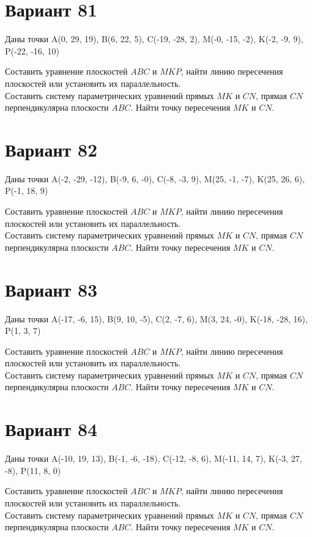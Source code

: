 \documentclass[11pt]{article}
\begin{document}
\section*{Вариант 81}
Даны точки A(0, 29, 19), B(6, 22, 5), C(-19, -28, 2), M(-0, -15, -2), K(-2, -9, 9), P(-22, -16, 10)

Составить уравнение плоскостей $ABC$ и $MKP$, найти линию пересечения плоскостей или установить их параллельность.\\
Составить систему параметрических уравнений прямых $MK$ и $CN$, прямая $CN$ перпендикулярна плоскости $ABC$. Найти точку пересечения $MK$ и $CN$.

\section*{Вариант 82}
Даны точки A(-2, -29, -12), B(-9, 6, -0), C(-8, -3, 9), M(25, -1, -7), K(25, 26, 6), P(-1, 18, 9)

Составить уравнение плоскостей $ABC$ и $MKP$, найти линию пересечения плоскостей или установить их параллельность.\\
Составить систему параметрических уравнений прямых $MK$ и $CN$, прямая $CN$ перпендикулярна плоскости $ABC$. Найти точку пересечения $MK$ и $CN$.

\section*{Вариант 83}
Даны точки A(-17, -6, 15), B(9, 10, -5), C(2, -7, 6), M(3, 24, -0), K(-18, -28, 16), P(1, 3, 7)

Составить уравнение плоскостей $ABC$ и $MKP$, найти линию пересечения плоскостей или установить их параллельность.\\
Составить систему параметрических уравнений прямых $MK$ и $CN$, прямая $CN$ перпендикулярна плоскости $ABC$. Найти точку пересечения $MK$ и $CN$.

\section*{Вариант 84}
Даны точки A(-10, 19, 13), B(-1, -6, -18), C(-12, -8, 6), M(-11, 14, 7), K(-3, 27, -8), P(11, 8, 0)

Составить уравнение плоскостей $ABC$ и $MKP$, найти линию пересечения плоскостей или установить их параллельность.\\
Составить систему параметрических уравнений прямых $MK$ и $CN$, прямая $CN$ перпендикулярна плоскости $ABC$. Найти точку пересечения $MK$ и $CN$.
\end{document}
